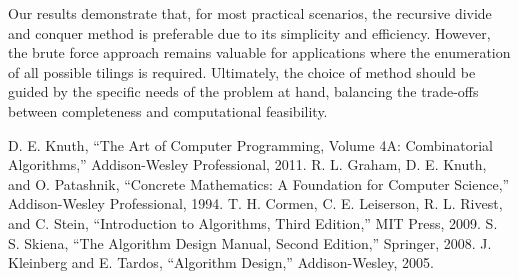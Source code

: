 \documentclass[conference]{IEEEtran}
\begin{document}
Our results demonstrate that, for most practical scenarios, the recursive divide and conquer method is preferable due to its simplicity and efficiency. However, the brute force approach remains valuable for applications where the enumeration of all possible tilings is required. Ultimately, the choice of method should be guided by the specific needs of the problem at hand, balancing the trade-offs between completeness and computational feasibility.

\begin{thebibliography}{00}
 D. E. Knuth, ``The Art of Computer Programming, Volume 4A: Combinatorial Algorithms,'' Addison-Wesley Professional, 2011.
 R. L. Graham, D. E. Knuth, and O. Patashnik, ``Concrete Mathematics: A Foundation for Computer Science,'' Addison-Wesley Professional, 1994.
 T. H. Cormen, C. E. Leiserson, R. L. Rivest, and C. Stein, ``Introduction to Algorithms, Third Edition,'' MIT Press, 2009.
 S. S. Skiena, ``The Algorithm Design Manual, Second Edition,'' Springer, 2008.
 J. Kleinberg and E. Tardos, ``Algorithm Design,'' Addison-Wesley, 2005.
\end{thebibliography}
\end{document}
